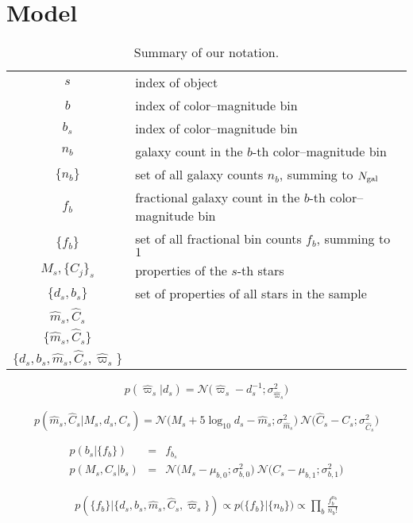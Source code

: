 \documentclass[aps,prd,showpacs,superscriptaddress,groupedaddress]{revtex4}  %
\newcommand{\equ}[1]{\begin{equation}#1\end{equation}}
\newcommand{\eqn}[1]{\begin{eqnarray}#1\end{eqnarray}}
\newcommand{\nobj}{{N_{\rm gal}}}
\begin{document}
\section{Model}


\begin{table} %
\centering
\begin{tabular}{cl}
\hline
$s$	&	index of object \\
$b$	&	index of color--magnitude bin\\
$b_s$	&	index of color--magnitude bin\\
$n_b$	& 	galaxy count in the $b$-th color--magnitude bin  \\
$\{n_b\}$	&	set of all galaxy counts $n_b$, summing to $\nobj$\\
$f_b$	&	fractional galaxy count in the $b$-th color--magnitude bin  \\
$\{f_b\}$	&	set of all fractional bin counts $f_b$, summing to $1$\\
$M_s, \{C_j\}_s$	&	properties of the $s$-th stars	\\
$\{ d_s, b_s\}$	&	set of properties of all stars in the sample	\\
$\hat{m}_s, \hat{C}_s$ 	&	\\
$\{ \hat{m}_s, \hat{C}_s \}$ &	\\
$\{ d_s, b_s, \hat{m}_s, \hat{C}_s, \hat{\varpi}_s \}$	 	&	\\
\hline
\end{tabular}
\caption{Summary of our notation. }
\label{tab:notation}
\end{table} 



\equ{
	p\left(\hat{\varpi}_s \bigr\rvert d_s\right) = \mathcal{N}\bigl(\hat{\varpi}_s - d_s^{-1};\sigma_{\hat{\varpi}_s}^2 \bigr)
}

\equ{
	p\left(\hat{m}_s, \hat{C}_s \bigr\rvert M_s, d_s, C_s\right)  =  \mathcal{N}\bigl( M_s + 5\log_{10}d_s  -\hat{m}_s ;\sigma_{\hat{m}_s}^2 \bigr) \  \mathcal{N}\bigl(\hat{C}_s - C_s;\sigma_{\hat{C}_s}^2 \bigr)
}

\eqn{
	p\left(b_s \bigr\rvert \bigl\{ f_b \bigr\}\right) &=& f_{b_s} \\ 
	p\left(M_s, C_s \bigr\rvert b_s \right) &=& \mathcal{N}\bigl(M_s - \mu_{b,0};\sigma_{b,0}^2 \bigr)  \ \mathcal{N}\bigl(C_s - \mu_{b,1};\sigma_{b,1}^2 \bigr)
}


\eqn{
	p\left(\bigl\{ f_b \bigr\} \bigr\rvert \bigl\{ d_s, b_s, \hat{m}_s, \hat{C}_s, \hat{\varpi}_s \bigr\} \right) \propto p\bigl( \bigl\{ f_b \bigr\} \bigr\rvert \{n_b \} \bigr) \propto \prod_b \frac{ f_b^{n_b} }{n_b !}
}
\end{document}
